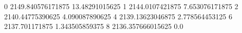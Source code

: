 0 2149.840576171875 13.48291015625
1 2144.0107421875 7.653076171875
2 2140.44775390625 4.090087890625
4 2139.13623046875 2.778564453125
6 2137.701171875 1.343505859375
8 2136.357666015625 0.0
